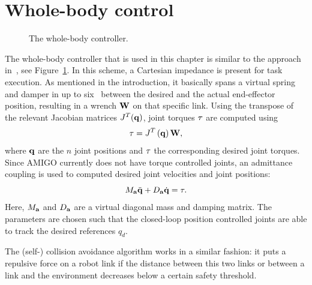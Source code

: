 \section{Whole-body control}\label{wbp:sec:wbc}
\begin{figure}[t]
    \begin{center}
        \footnotesize
        \def\svgwidth{\linewidth}
        
        \caption{The whole-body controller.}
        \label{wbp:fig:wbc}
    \end{center}
\end{figure}
The whole-body controller that is used in this chapter is similar to the approach in~\citet{Dietrich2012}, see Figure~\ref{wbp:fig:wbc}. In this scheme, a Cartesian impedance is present for task execution. As mentioned in the introduction, it basically spans a virtual spring and damper in up to six \dofs\ between the desired and the actual end-effector position, resulting in a wrench $\mathbf{W}$ on that specific link. Using the transpose of the relevant Jacobian matrices $J^T(\mathbf{q})$, joint torques $\mathbf{\tau}$ are computed using
\begin{equation}
    \mathbf{\tau} = J^T\left(\mathbf{q}\right)\mathbf{W},
\end{equation}
where $\mathbf{q}$ are the $n$ joint positions and $\mathbf{\tau}$ the corresponding desired joint torques. Since AMIGO currently does not have torque controlled joints, an admittance coupling is used to computed desired joint velocities and joint positions:
\begin{equation}
    M_{\mathbf{a}} \ddot {\mathbf{q}} + D_{\mathbf{a}} \dot {\mathbf{q}} = \mathbf{\tau}.
\end{equation}
Here, $M_{\mathbf{a}}$ and $D_{\mathbf{a}}$ are a virtual diagonal mass and damping matrix. The parameters are chosen such that the closed-loop position controlled joints are able to track the desired references $q_d$.

The (self-) collision avoidance algorithm works in a similar fashion: it puts a repulsive force on a robot link if the distance between this two links or between a link and the environment decreases below a certain safety threshold.

